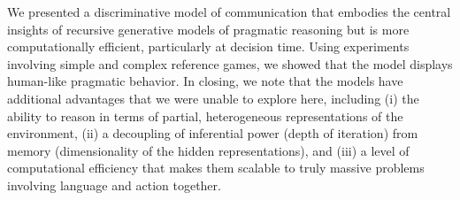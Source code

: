 We presented a discriminative model of communication that embodies the
central insights of recursive generative models of pragmatic reasoning
but is more computationally efficient, particularly at decision
time. Using experiments involving simple and complex reference games,
we showed that the model displays human-like pragmatic behavior.  In
closing, we note that the models have additional advantages that we
were unable to explore here, including (i) the ability to reason in
terms of partial, heterogeneous representations of the environment,
(ii) a decoupling of inferential power (depth of iteration) from
memory (dimensionality of the hidden representations), and (iii) a
level of computational efficiency that makes them scalable to truly 
massive problems involving language and action together.
